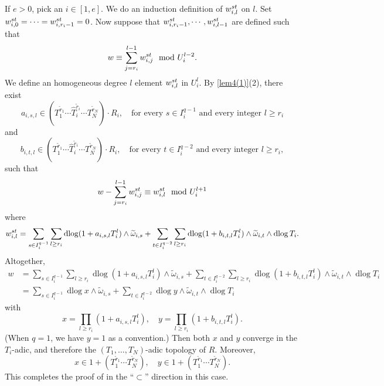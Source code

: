 \documentclass[11pt]{amsart}
\newcommand{\dlog}{\operatorname{dlog}}
\renewcommand{\hat}{\widehat}
\renewcommand{\tilde}{\widetilde}
\theoremstyle{plain}
\theoremstyle{definition}
\numberwithin{equation}{prop}
\begin{document}
If $e>0$, pick an $i\in [1,e]$. 
We do an induction definition of $w_{i,l}^{\rm st}$ on $l$.
Set $w_{i,0}^{\rm st}=\cdots=w_{i,r_i-1}^{\rm st}=0$.
Now suppose that $w_{i,r_i-1}^{\rm st},\cdots, w_{i,l-1}^{\rm st}$ are defined such that
$$w\equiv \sum_{j=r_i}^{l-1} w_{i,j}^{\rm st}\mod U_i^{l-2}.$$
We define an homogeneous degree $l$ element $w_{i,l}^{\rm st}$ in $U_i^l$.
By \eqref{lem4(1)}(2), 
there exist
$$a_{i,s,l}\in (T_1^{\tilde r_1}\cdots \hat T_i^{\tilde r_i}\cdots T_N^{\tilde r_N})\cdot R_i,\quad 
\text{for every }s\in I_i^{q-1}\text{ and every integer } l\ge r_i$$
and 
$$b_{i,t, l}\in (T_1^{\tilde r_1}\cdots \hat T_i^{\tilde r_i}\cdots T_N^{\tilde r_N})\cdot R_i,\quad
\text{for every }t\in I_i^{q-2}\text{ and every integer } l\ge r_i,$$
such that
$$w - \sum_{j=r_i}^{l-1} w_{i,j}^{\rm st}
\equiv
w_{i,l}^{\rm st}
\mod U_i^{l+1}$$
where 
$$w_{i,l}^{\rm st}
=\sum_{s\in I_i^{q-1}}\sum_{l\ge r_i}
\dlog(1+a_{i,s,l}T_i^{l})\wedge \tilde \omega_{i,s}
+
\sum_{t\in I_i^{q-2}} \sum_{l\ge r_i}
\dlog(1+b_{i,t,l}T_i^{l})\wedge \tilde \omega_{i,t}\wedge \dlog T_i
.$$
Altogether,
\begin{align*}
w&=
\sum_{s\in I_i^{q-1}}\sum_{l\ge r_i}
\dlog(1+a_{i,s,l}T_i^{l})\wedge \tilde \omega_{i,s}
+
\sum_{t\in I_i^{q-2}}\sum_{l\ge r_i}
\dlog (1+b_{i,t,l}T_i^{l})
\wedge \tilde \omega_{i,t}\wedge \dlog T_i
\\
&=
\sum_{s\in I_i^{q-1}}\dlog x\wedge \tilde \omega_{i,s}
+
\sum_{t\in I_i^{q-2}}
\dlog y
\wedge \tilde \omega_{i,t}\wedge \dlog T_i
\end{align*}
with
$$x=\prod_{l\ge r_i} (1+a_{i,s,l}T_i^l),
\quad
y=\prod_{l\ge r_i} (1+b_{i,t,l}T_i^{l}).
$$
(When $q=1$, we have $y=1$ as a convention.)
Then both $x$ and $y$ converge in the $T_i$-adic, and therefore the $(T_1,\dots,T_N)$-adic topology of $R$. 
Moreover, 
$$x\in 1+(T_1^{\tilde r_1}\cdots T_N^{\tilde r_N}),
\quad 
y\in 1+(T_1^{\tilde r_1}\cdots  T_N^{\tilde r_N}).$$
This completes the proof of  in the ``$\subset$'' direction in this case.
\end{document}
